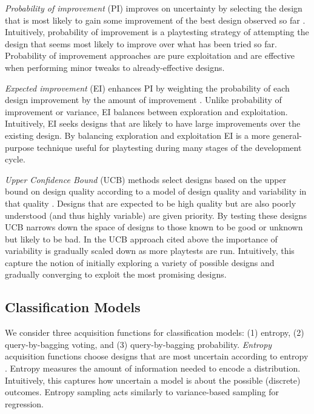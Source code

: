 \documentclass{sig-alternate}
\begin{document}
\textit{Probability of improvement} (PI) improves on uncertainty by selecting the design that is most likely to gain some improvement of the best design observed so far \cite{brochu2010:thesis}. 
Intuitively, probability of improvement is a playtesting strategy of attempting the design that seems most likely to improve over what has been tried so far.
Probability of improvement approaches are pure exploitation and are effective when performing minor tweaks to already-effective designs.

\textit{Expected improvement} (EI) enhances PI by weighting the probability of each design improvement by the amount of improvement \cite{brochu2010:thesis}.
Unlike probability of improvement or variance, EI balances between exploration and exploitation.
Intuitively, EI seeks designs that are likely to have large improvements over the existing design.
By balancing exploration and exploitation EI is a more general-purpose technique useful for playtesting during many stages of the development cycle.

\textit{Upper Confidence Bound} (UCB) methods select designs based on the upper bound on design quality according to a model of design quality and variability in that quality \cite{srinivas2010:gp-ucb}.
Designs that are expected to be high quality but are also poorly understood (and thus highly variable) are given priority.
By testing these designs UCB narrows down the space of designs to those known to be good or unknown but likely to be bad.
In the UCB approach cited above the importance of variability is gradually scaled down as more playtests are run.
Intuitively, this capture the notion of initially exploring a variety of possible designs and gradually converging to exploit the most promising designs.



\subsection{Classification Models}
We consider three acquisition functions for classification models: (1) entropy, (2) query-by-bagging voting, and (3) query-by-bagging probability.
\textit{Entropy} acquisition functions choose designs that are most uncertain according to entropy \cite{settles2012:al-book}.
Entropy measures the amount of information needed to encode a distribution.
Intuitively, this captures how uncertain a model is about the possible (discrete) outcomes.
Entropy sampling acts similarly to variance-based sampling for regression.
\end{document}
